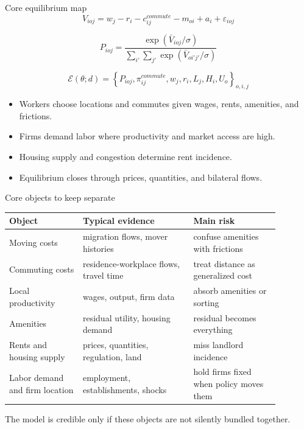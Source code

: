 \documentclass[aspectratio=169,11pt]{beamer}
\newcommand{\1}{\mathbf{1}}
\begin{document}
\begin{frame}{Core equilibrium map}
\small
\[
V_{ioj}
=
w_j-r_i-c_{ij}^{commute}-m_{oi}+a_i+\varepsilon_{ioj}
\]

\[
P_{ioj}
=
\frac{\exp(\bar V_{ioj}/\sigma)}
{\sum_{i'}\sum_{j'}\exp(\bar V_{oi'j'}/\sigma)}
\]

\[
\mathcal{E}(\theta;d)
=
\left\{
P_{ioj},\pi_{ij}^{commute},w_j,r_i,L_j,H_i,U_o
\right\}_{o,i,j}
\]

\begin{itemize}
    \item Workers choose locations and commutes given wages, rents, amenities, and frictions.
    \item Firms demand labor where productivity and market access are high.
    \item Housing supply and congestion determine rent incidence.
    \item Equilibrium closes through prices, quantities, and bilateral flows.
\end{itemize}
\end{frame}

\begin{frame}{Core objects to keep separate}
\small
\begin{tabular}{p{0.24\linewidth} p{0.36\linewidth} p{0.28\linewidth}}
\toprule
Object & Typical evidence & Main risk \\
\midrule
Moving costs & migration flows, mover histories & confuse amenities with frictions \\
Commuting costs & residence-workplace flows, travel time & treat distance as generalized cost \\
Local productivity & wages, output, firm data & absorb amenities or sorting \\
Amenities & residual utility, housing demand & residual becomes everything \\
Rents and housing supply & prices, quantities, regulation, land & miss landlord incidence \\
Labor demand and firm location & employment, establishments, shocks & hold firms fixed when policy moves them \\
\bottomrule
\end{tabular}

\medskip
The model is credible only if these objects are not silently bundled together.
\end{frame}
\end{document}
